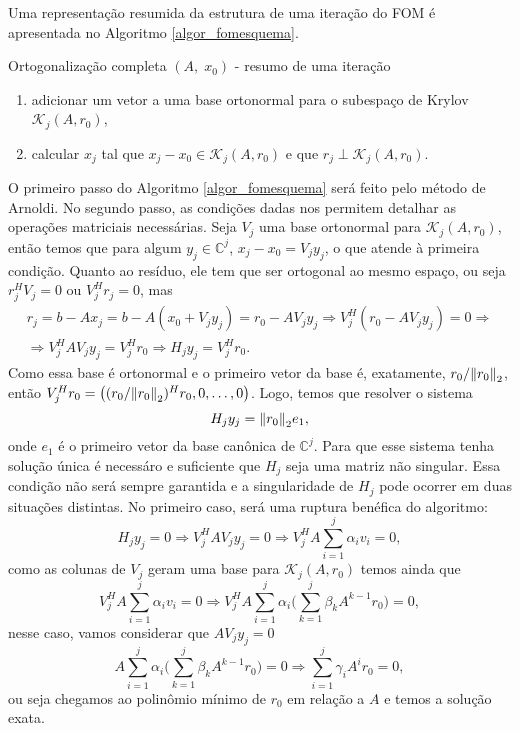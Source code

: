 Uma representação resumida da estrutura de uma iteração do FOM é apresentada no Algoritmo \ref{algor_fomesquema}.
     \begin{algor}[htb]
\caption{Ortogonalização completa $(A,\;x_0)$ - resumo de uma iteração}\label{algor_fomesquema}
{%
\begin{enumerate}
\renewcommand{\labelenumi}{\theenumi:}
\setlength{\itemsep}{.01cm}
\item\label{algor_fomesquema_arnoldi} adicionar um vetor a uma base ortonormal para o subespaço de Krylov $\mathcal{K}_j(A,r_0)$,
\item\label{algor_fomesquema_xjrj} calcular $x_j$ tal que $x_j-x_0\in \mathcal{K}_j(A,r_0)$ e que $r_j\perp \mathcal{K}_j(A,r_0)$.
\renewcommand{\labelenumi}{\theenumi.}
\end{enumerate}
}
\end{algor}
O primeiro passo do Algoritmo \ref{algor_fomesquema} será feito pelo método de Arnoldi. No segundo passo, as condições dadas nos permitem detalhar as operações matriciais necessárias. Seja $V_j$ uma base ortonormal para $\mathcal{K}_j(A,r_0)$, então temos que para algum $y_j\in\mathbb{C}^j$, $x_j-x_0=V_jy_j$, o que atende à primeira condição. Quanto ao  resíduo, ele tem que ser ortogonal ao mesmo espaço, ou seja $r_j^HV_j=0$ ou $V_j^Hr_j=0$, mas
\begin{multline*}
r_j=b-Ax_j=b-A(x_0+V_jy_j)=r_0-AV_jy_j\Rightarrow V_j^H(r_0-AV_jy_j)=0\Rightarrow \\ \Rightarrow V_j^HAV_jy_j=V_j^Hr_0 \Rightarrow H_jy_j=V_j^Hr_0.
\end{multline*}
Como essa base é ortonormal e o primeiro vetor da base é, exatamente, $r_0/{\Vert r_0\Vert}_2$, então $V_j^Hr_0=\big((r_0/{\Vert r_0\Vert}_2)^Hr_0,0,\ldots,0\big)$. Logo, temos que resolver o sistema
\[
H_jy_j={\Vert r_0\Vert}_2 e_1,
\]
onde $e_1$ é o primeiro vetor da base canônica de $\mathbb{C}^j$. Para que esse sistema tenha solução única é necessáro e suficiente que $H_j$ seja uma matriz não singular. Essa condição não será sempre garantida e a singularidade de $H_j$ pode ocorrer em duas situações distintas. No primeiro caso, será uma ruptura benéfica do algoritmo:
\[
H_jy_j=0\Rightarrow V_j^HAV_jy_j=0\Rightarrow V_j^HA\sum_{i=1}^j\alpha_iv_i=0,
\]
como as colunas de $V_j$ geram uma base para   $\mathcal{K}_j(A,r_0)$ temos ainda que
\[
V_j^HA\sum_{i=1}^j\alpha_iv_i=0\Rightarrow V_j^HA\sum_{i=1}^j\alpha_i\bigg(\sum_{k=1}^j\beta_k A^{k-1}r_0\bigg)=0,
\]
nesse caso, vamos considerar que $AV_jy_j=0$
\[
A\sum_{i=1}^j\alpha_i\bigg(\sum_{k=1}^j\beta_k A^{k-1}r_0\bigg)=0\Rightarrow \sum_{i=1}^j \gamma_i A^ir_0=0,
\]
ou seja chegamos ao polinômio mínimo de $r_0$ em relação a $A$ e temos a solução exata.

